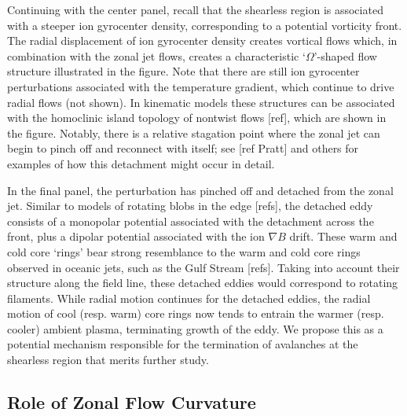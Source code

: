 \documentclass[]{article}
\begin{document}
Continuing with the center panel, recall that the shearless region is associated with a steeper ion gyrocenter density, corresponding to a potential vorticity front.
The radial displacement of ion gyrocenter density creates vortical flows which, in combination with the zonal jet flows, creates a characteristic `\(\Omega\)'-shaped flow structure illustrated in the figure.
Note that there are still ion gyrocenter perturbations associated with the temperature gradient, which continue to drive radial flows (not shown).
In kinematic models these structures can be associated with the homoclinic island topology of nontwist flows [ref], which are shown in the figure.
Notably, there is a relative stagation point where the zonal jet can begin to pinch off and reconnect with itself; see [ref Pratt] and others for examples of how this detachment might occur in detail.

In the final panel, the perturbation has pinched off and detached from the zonal jet.
Similar to models of rotating blobs in the edge [refs], the detached eddy consists of a monopolar potential associated with the detachment across the front, plus a dipolar potential associated with the ion \(\nabla B\) drift.
These warm and cold core `rings' bear strong resemblance to the warm and cold core rings observed in oceanic jets, such as the Gulf Stream [refs].
Taking into account their structure along the field line, these detached eddies would correspond to rotating filaments.
While radial motion continues for the detached eddies, the radial motion of cool (resp. warm) core rings now tends to entrain the warmer (resp. cooler) ambient plasma, terminating growth of the eddy.
We propose this as a potential mechanism responsible for the termination of avalanches at the shearless region that merits further study.






\newcommand{\citep}[1]{[ref]}
\newcommand{\citet}[1]{[ref]}


\subsection{Role of Zonal Flow Curvature}
\end{document}

